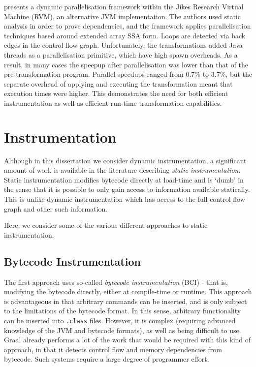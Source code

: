 \citet{Rogers2005} presents a dynamic parallelisation framework within the Jikes Research Virtual Machine (RVM), an alternative JVM implementation. The authors used static analysis in order to prove dependencies, and the framework  applies parallelisation techniques based around extended array SSA form. Loops are detected via back edges in the control-flow graph. Unfortunately, the transformations added Java threads as a parallelisation primitive, which have high spawn overheads. As a result, in many cases the speepup after parallelisation was lower than that of the pre-transformation program. Parallel speedups ranged from 0.7\% to 3.7\%, but the separate overhead of applying and executing the transformation meant that execution times were higher. This demonstrates the need for both efficient instrumentation as well as efficient run-time transformation capabilities.

\section{Instrumentation} \label{sec:related/instrumentation}
Although in this dissertation we consider dynamic instrumentation, a significant amount of work is available in the literature describing \emph{static instrumentation}. Static instrumentation modifies bytecode directly at load-time and is `dumb' in the sense that it is possible to only gain access to information available statically. This is unlike dynamic instrumentation which has access to the full control flow graph and other such information.

Here, we consider some of the various different approaches to static instrumentation.

\subsection{Bytecode Instrumentation} \label{sec:instrumentation/bytecode-instr}
The first approach uses so-called \textit{bytecode instrumentation} (BCI) - that is, modifying the bytecode directly, either at compile-time or runtime. This approach is advantageous in that arbitrary commands can be inserted, and is only subject to the limitations of the bytecode format. In this sense, arbitrary functionality can be inserted into \texttt{.class} files. However, it is complex (requiring advanced knowledge of the JVM and bytecode formats), as well as being difficult to use. Graal already performs a lot of the work that would be required with this kind of approach, in that it detects control flow and memory dependencies from bytecode. Such systems require a large degree of programmer effort.


